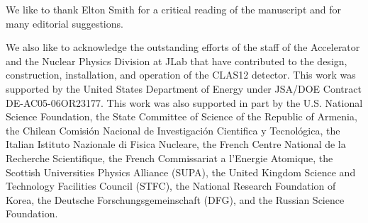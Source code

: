 \documentclass[final,3p,twocolumn]{elsarticle}
\begin{document}

We like to thank Elton Smith for a critical reading of the manuscript and for many editorial suggestions. 
\vspace{0.3cm}

We also like to acknowledge the outstanding efforts of the staff of the Accelerator and the Nuclear Physics
Division at JLab that have contributed to the design, construction, installation, and operation of the CLAS12
detector. This work was supported by the United States Department of Energy under JSA/DOE Contract
DE-AC05-06OR23177. This work was also supported in part by the U.S. National Science Foundation, the State
Committee of Science of the Republic of Armenia, the Chilean Comisi\'on Nacional de Investigaci\'on Cientifica y
Tecnol\'ogica, the Italian Istituto Nazionale di Fisica Nucleare, the French Centre National de la Recherche
Scientifique, the French Commissariat a l'Energie Atomique, the Scottish Universities Physics Alliance (SUPA),
the United Kingdom Science and Technology Facilities Council (STFC), the National Research Foundation of Korea,
the Deutsche Forschungsgemeinschaft (DFG), and the Russian Science Foundation. 
\end{document}
